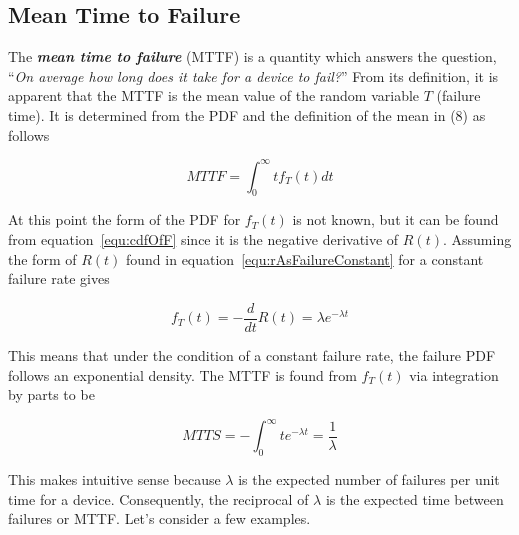 \subsection{Mean Time to Failure}
\label{subsection:mean-time-to-failure}

The \emph{\textbf{mean time to failure}} (MTTF) is a quantity which
answers the question, ``\emph{On average how long does it take for a
device to fail?}'' From its definition, it is apparent that the MTTF is
the mean value of the random variable $T$ (failure time). It is
determined from the PDF and the definition of the mean in (8) as follows

\begin{equation}
\label{equ:mttfIntegral}
MTTF = \int^\infty_0 t f_T(t) dt 
\end{equation}

At this point the form of the PDF for $f_T(t)$ is not known, but it can be
found from equation~\ref{equ:cdfOfF} since it is the negative derivative 
of $R(t)$. Assuming the form of $R(t)$ found in 
equation~\ref{equ:rAsFailureConstant} for a constant failure rate gives

\begin{equation}
\label{equ:mttfConstantFailureRate}
f_T(t) = -\frac{d}{dt}R(t) = \lambda e^{-\lambda t}
\end{equation}

This means that under the condition of a constant failure rate, the
failure PDF follows an exponential density. The MTTF is found from
$f_T(t)$ via integration by parts to be

\begin{equation}
\label{equ:mttfConstantFailureRate}
MTTS = -\int^\infty_0 t e^{-\lambda t} = \frac{1}{\lambda}
\end{equation}

This makes intuitive sense because $\lambda$ is the expected number of
failures per unit time for a device. Consequently, the reciprocal of
$\lambda$ is the expected time between failures or MTTF. Let's consider a
few examples.

